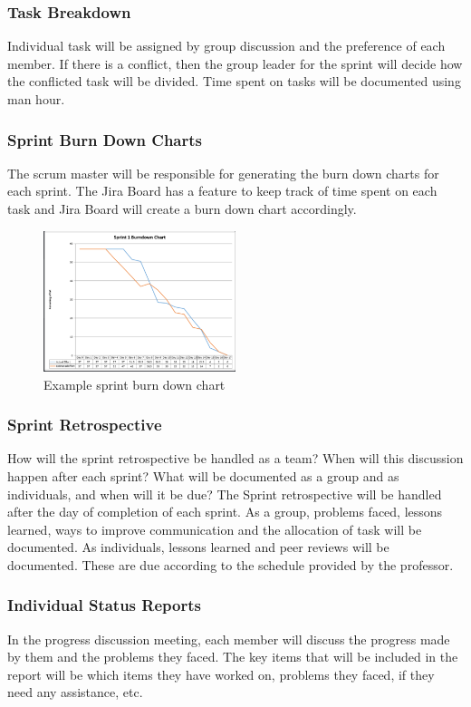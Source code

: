\subsubsection{Task Breakdown}
Individual task will be assigned by group discussion and the preference of each member. If there is a conflict, then the group leader for the sprint will decide how the conflicted task will be divided. Time spent on tasks will be documented using man hour.

\subsubsection{Sprint Burn Down Charts}
The scrum master will be responsible for generating the burn down charts for each sprint. The Jira Board has a feature to keep track of time spent on each task and Jira Board will create a burn down chart accordingly.

\begin{figure}[h!]
    \centering
    \includegraphics[width=0.5\textwidth]{images/burndown}
    \caption{Example sprint burn down chart}
\end{figure}

\subsubsection{Sprint Retrospective}
How will the sprint retrospective be handled as a team? When will this discussion happen after each sprint? What will be documented as a group and as individuals, and when will it be due?
The Sprint retrospective will be handled after the day of completion of each sprint. As a group, problems faced, lessons learned, ways to improve communication and the allocation of task will be documented. As individuals, lessons learned and peer reviews will be documented. These are due according to the schedule provided by the professor.

\subsubsection{Individual Status Reports}
In the progress discussion meeting, each member will discuss the progress made by them and the problems they faced. The key items that will be included in the report will be which items they have worked on, problems they faced, if they need any assistance, etc.

